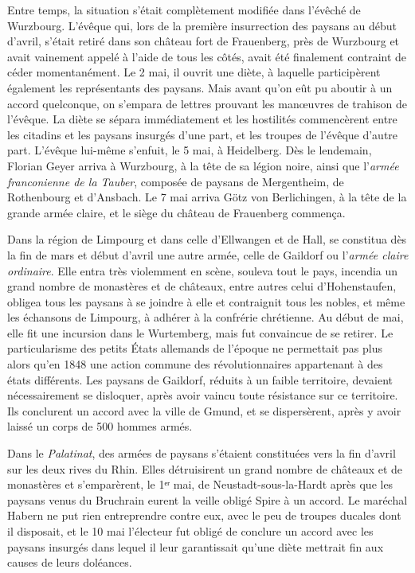 \documentclass[french,twoside]{book} %
\begin{document}
Entre temps, la situation s’était complètement modifiée dans l’évêché de Wurzbourg. L’évêque qui, lors de la première insurrection des paysans au début d’avril, s’était retiré dans son château fort de Frauenberg, près de Wurzbourg et avait vainement appelé à l’aide de tous les côtés, avait été finalement contraint de céder momentanément. Le 2 mai, il ouvrit une diète, à laquelle participèrent également les représentants des paysans. Mais avant qu’on eût pu aboutir à un accord quelconque, on s’empara de lettres prouvant les manœuvres de trahison de l’évêque. La diète se sépara immédiatement et les hostilités commencèrent entre les citadins et les paysans insurgés d’une part, et les troupes de l’évêque d’autre part. L’évêque lui-même s’enfuit, le 5 mai, à Heidelberg. Dès le lendemain, Florian Geyer arriva à Wurzbourg, à la tête de sa légion noire, ainsi que l’\emph{armée franconienne de la Tauber}, composée de paysans de Mergentheim, de Rothenbourg et d’Ansbach. Le 7 mai arriva Götz von Berlichingen, à la tête de la grande armée claire, et le siège du château de Frauenberg commença.\par
Dans la région de Limpourg et dans celle d’Ellwangen et de Hall, se constitua dès la fin de mars et début d’avril une autre armée, celle de Gaildorf ou l’\emph{armée claire ordinaire}. Elle entra très violemment en scène, souleva tout le pays, incendia un grand nombre de monastères et de châteaux, entre autres celui d’Hohenstaufen, obligea tous les paysans à se joindre à elle et contraignit tous les nobles, et même les échansons de Limpourg, à adhérer à la confrérie chrétienne. Au début de mai, elle fit une incursion dans le Wurtemberg, mais fut convaincue de se retirer. Le particularisme des petits États allemands de l’époque ne permettait pas plus alors qu’en 1848 une action commune des révolutionnaires appartenant à des états différents. Les paysans de Gaildorf, réduits à un faible territoire, devaient nécessairement se disloquer, après avoir vaincu toute résistance sur ce territoire. Ils conclurent un accord avec la ville de Gmund, et se dispersèrent, après y avoir laissé un corps de 500 hommes armés.\par
Dans le \emph{Palatinat}, des armées de paysans s’étaient constituées vers la fin d’avril sur les deux rives du Rhin. Elles détruisirent un grand nombre de châteaux et de monastères et s’emparèrent, le 1ᵉʳ mai, de Neustadt-sous-la-Hardt après que les paysans venus du Bruchrain eurent la veille obligé Spire à un accord. Le maréchal Habern ne put rien entreprendre contre eux, avec le peu de troupes ducales dont il disposait, et le 10 mai l’électeur fut obligé de conclure un accord avec les paysans insurgés dans lequel il leur garantissait qu’une diète mettrait fin aux causes de leurs doléances.\par
\end{document}
